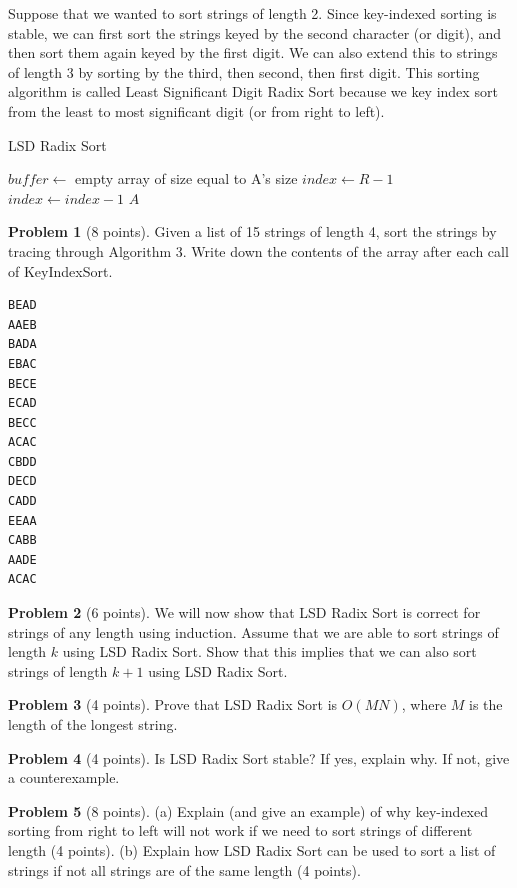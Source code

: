 \documentclass{exam}
\theoremstyle{definition}
\newtheorem{problem}{Problem}[section]
\theoremstyle{definition}
\begin{document}
Suppose that we wanted to sort strings of length 2. Since key-indexed sorting is stable, we can first sort the strings keyed by the second character (or digit), and then sort them again keyed by the first digit. We can also extend this to strings of length 3 by sorting by the third, then second, then first digit. This sorting algorithm is called Least Significant Digit Radix Sort because we key index sort from the least to most significant digit (or from right to left). 


\begin{algorithm}[H]
\caption{LSD Radix Sort}
\begin{algorithmic}
    \State $ buffer \gets $ empty array of size equal to A's size
    \State $index \gets R-1$
        \State {}
        \State $ index \gets index - 1 $
        \State {}
    \EndWhile
    \State \Return $A$
\EndFunction
\end{algorithmic}
\end{algorithm}


\begin{problem}[8 points]
    Given a list of 15 strings of length 4, sort the strings by tracing through Algorithm 3. Write down the contents of the array after each call of KeyIndexSort. 
    \begin{verbatim}
BEAD
AAEB
BADA
EBAC
BECE
ECAD
BECC
ACAC
CBDD
DECD
CADD
EEAA
CABB
AADE
ACAC
    \end{verbatim}
\end{problem}

\begin{problem}[6 points]
    We will now show that LSD Radix Sort is correct for strings of any length using induction. Assume that we are able to sort strings of length $k$ using LSD Radix Sort. Show that this implies that we can also sort strings of length $k+1$ using LSD Radix Sort. 
\end{problem}

\begin{problem}[4 points]
    Prove that LSD Radix Sort is $O(MN)$, where $M$ is the length of the longest string.
\end{problem}

\begin{problem}[4 points]
    Is LSD Radix Sort stable? If yes, explain why. If not, give a counterexample. 
\end{problem}

\begin{problem}[8 points]
    (a) Explain (and give an example) of why key-indexed sorting from right to left will not work if we need to sort strings of different length (4 points).
    (b) Explain how LSD Radix Sort can be used to sort a list of strings if not all strings are of the same length (4 points). 
\end{problem}
\end{document}
